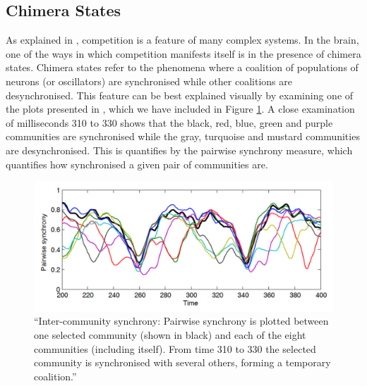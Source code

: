 \documentclass[a4paper,11pt]{article}
\begin{document}
\subsection{Chimera States}
\label{sec:bg:chimera}

As explained in \cite{Shanahan2010}, competition is a feature of many complex systems. In the brain, one of the ways in which competition manifests itself is in the presence of chimera states. Chimera states refer to the phenomena where a coalition of populations of neurons (or oscillators) are synchronised while other coalitions are desynchronised. This feature can be best explained visually by examining one of the plots presented in \cite{Shanahan2010}, which we have included in Figure \ref{Shanahan2010_Chimera}. A close examination of milliseconds 310 to 330 shows that the black, red, blue, green and purple communities are synchronised while the gray, turquoise and mustard communities are desynchronised. This is quantifies by the pairwise synchrony measure, which quantifies how synchronised a given pair of communities are.

\begin{figure}[H]
\centering
\includegraphics[scale = 0.5]{Shanahan2010_Chimera}
\caption{
	``Inter-community synchrony: Pairwise synchrony is plotted between one selected community (shown in black) and each of the eight communities (including itself). From time 310 to 330 the selected community is synchronised with several others, forming a temporary coalition.'' \cite{Shanahan2010}
	\label{Shanahan2010_Chimera}
}
\end{figure}

\end{document}
